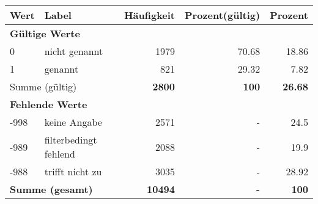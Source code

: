      \begin{longtable}{lXrrr}
     \toprule
     \textbf{Wert} & \textbf{Label} & \textbf{Häufigkeit} & \textbf{Prozent(gültig)} & \textbf{Prozent} \\
     \endhead
     \midrule
     \multicolumn{5}{l}{\textbf{Gültige Werte}}\\

     0 &
     \multicolumn{1}{X}{ nicht genannt   } &


       \num{1979} &
       \num[round-mode=places,round-precision=2]{70.68} &
         \num[round-mode=places,round-precision=2]{18.86} \\

     1 &
     \multicolumn{1}{X}{ genannt   } &


       \num{821} &
       \num[round-mode=places,round-precision=2]{29.32} &
         \num[round-mode=places,round-precision=2]{7.82} \\
     \midrule
     \multicolumn{2}{l}{Summe (gültig)} &
       \textbf{\num{2800}} &
     \textbf{\num{100}} &
       \textbf{\num[round-mode=places,round-precision=2]{26.68}} \\
     \multicolumn{5}{l}{\textbf{Fehlende Werte}}\\
       -998 &
       keine Angabe &
         \num{2571} &
        - &
         \num[round-mode=places,round-precision=2]{24.5} \\
       -989 &
       filterbedingt fehlend &
         \num{2088} &
        - &
         \num[round-mode=places,round-precision=2]{19.9} \\
       -988 &
       trifft nicht zu &
         \num{3035} &
        - &
         \num[round-mode=places,round-precision=2]{28.92} \\
     \midrule
     \multicolumn{2}{l}{\textbf{Summe (gesamt)}} &
          \textbf{\num{10494}} &
        \textbf{-} &
        \textbf{\num{100}} \\
     \bottomrule
     \end{longtable}
     
